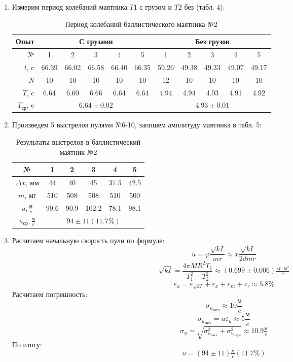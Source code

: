 \documentclass[a4paper, 10pt]{article}%
\begin{document}
\begin{enumerate}
		\item Измерим период колебаний маятника $T1$ с грузом и $T2$ без (табл. 4):
		\begin{table}[h]
			\centering
			\caption{Период колебаний баллистического маятника №2}
			\begin{tabular}{|r||c|c|c|c|c||c|c|c|c|c|}
				\hline
				Опыт & \multicolumn{5}{|c||}{С грузами} & \multicolumn{5}{|c|}{Без грузов} \\
				\hline
				№ & 1 & 2 & 3 & 4 & 5 & 1 & 2 & 3 & 4 & 5 \\
				\hline
				$t$, c & 66.39 & 66.02 & 66.58 & 66.40 & 66.35 & 59.26 & 49.38 & 49.33 & 49.07 & 49.17 \\
				\hline
				$N$ & 10 & 10 & 10 & 10 & 10 & 12 & 10 & 10 & 10 & 10 \\
				\hline
				$T$, c & 6.64 & 6.60 & 6.66 & 6.64 & 6.64 & 4.94 & 4.94 & 4.93 & 4.91 & 4.92 \\
				\hline
				$T_\text{ср}$, c & \multicolumn{5}{|c||}{$6.64 \pm 0.02$} & \multicolumn{5}{|c|}{$4.93 \pm 0.01$} \\
				\hline
			\end{tabular}
		\end{table}
		\item Произведем 5 выстрелов пулями №6-10, запишем амплитуду маятника в табл. 5:
		\begin{table}[h]
			\centering
			\caption{Результаты выстрелов в баллистический маятник №2}
			\begin{tabular}{|c|c|c|c|c|c|}
				\hline
				№ & 1 & 2 & 3 & 4 & 5 \\
				\hline
				$\Delta x$, мм & 44 & 40 & 45 & 37.5 & 42.5 \\
				\hline
				$m$, мг & 510 & 508 & 508 & 510 & 500 \\
				\hline
				$u, \frac{\text{м}}{c}$ & 99.6 & 90.9 & 102.2 & 78.1 & 98.1 \\
				\hline
				$u_\text{ср}, \frac{\text{м}}{c}$ & \multicolumn{5}{|c|}{\bf{$94 \pm 11 \left(11.7\%\right)$}} \\
				\hline
			\end{tabular}
		\end{table}
		\item Расчитаем начальную скорость пули по формуле:
		\[u = \varphi\dfrac{\sqrt{kI}}{mr} \approx x\dfrac{\sqrt{kI}}{2dmr}\]
		\[\sqrt{kI} = \dfrac{4\pi MR^2T_1}{T_1^2-T_2^2} \approx (0.699 \pm 0.006) \tfrac{\text{кг}\cdot\text{м}^2}{c}\]
		\[\varepsilon_u = \varepsilon_{\sqrt{kI}} + \varepsilon_x + \varepsilon_m + \varepsilon_r \approx 5.8\%\]
		Расчитаем погрешность:
		\[\sigma_{u_\text{случ}} \approx 10 \frac{\text{м}}{c}\]
		\[\sigma_{u_\text{сист}} = u\varepsilon_u \approx 5 \frac{\text{м}}{c}\]
		\[\sigma_u = \sqrt{\sigma_{u_\text{сист}}^2+\sigma_{u_\text{случ}}^2} \approx 10.9 \tfrac{\text{м}}{c}\]
		По итогу:
		\[u = \left(94 \pm 11\right) \tfrac{\text{м}}{c} (11.7\%)\]
	\end{enumerate}
\end{document}
